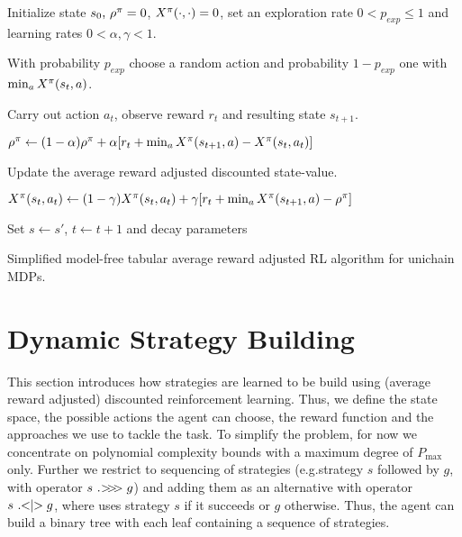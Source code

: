 \documentclass[envcountsame]{llncs}
\begin{document}
\begin{algorithm}[t!]
  \begin{algorithmic}[1]
    \State{}Initialize state \(s_{0}$, $\avgrew^{\pol} = 0\), \(X^{\pi}(\cdot, \cdot) = 0\), set
    an exploration rate \(0 < p_{exp} \leqslant 1\) and learning rates \(0 < \alpha, \gamma < 1\).
    \State{}
    \begin{minipage}[t]{0.9\textwidth} With probability \(p_{exp}\) choose a random action
      and probability \(1-p_{exp}\) one with \(\min_{a} X^{\pi}(s_{t},a)\).
    \end{minipage}
    \State{}Carry out action \(a_{t}\), observe reward \(r_{t}\) and resulting state \(s_{t+1}\).
    \State{}
    \begin{minipage}{0.9\textwidth}
      \centering
      \(\rho^{\pi}  \gets (1- \alpha) \rho^{\pi} + \alpha [r_{t} + \min_{a}X^\pi(s_{t+1},a) - X^\pi(s_{t},a_{t})]\)
    \end{minipage}
    \EndIf
    \State{}Update the average reward adjusted discounted state-value.
    \State{}
    \begin{minipage}{0.9\textwidth}
      \centering
      \(X^\pi(s_{t},a_{t}) \gets (1-\gamma) X^\pi(s_{t},a_{t}) + \gamma [r_{t} + \min_{a} X^\pi(s_{t+1},a) - \rho^{\pi}]\)
    \end{minipage}

    \State{}Set \(s \gets s'\), \(t \gets t+1\) and decay parameters
    \EndWhile{}
  \end{algorithmic}
  \caption{\label{alg:near}Simplified model-free tabular average reward adjusted RL algorithm for unichain MDPs.}
\end{algorithm}


\section{Dynamic Strategy Building}\label{sec:dyn}

This section introduces how strategies are learned to be build using (average reward adjusted)
discounted reinforcement learning. Thus, we define the state space, the possible actions the agent
can choose, the reward function and the approaches we use to tackle the task. To simplify the
problem, for now we concentrate on polynomial complexity bounds with a maximum degree of
\(P_{\max}\) only. Further we restrict to sequencing of strategies (e.g.\@ strategy \(s\) followed
by \(g\), with operator \(s \ .\hspace{-2.5pt}>\hspace{-3.0pt}>\hspace{-3.0pt}> g\)) and adding them as an alternative with operator \(s \ .\hspace{-3.0pt}<\hspace{-3.0pt}|\hspace{-3.0pt}> g\),
where \tct{} uses strategy \(s\) if it succeeds or \(g\) otherwise. Thus, the agent can build a
binary tree with each leaf containing a sequence of strategies. %
\end{document}
